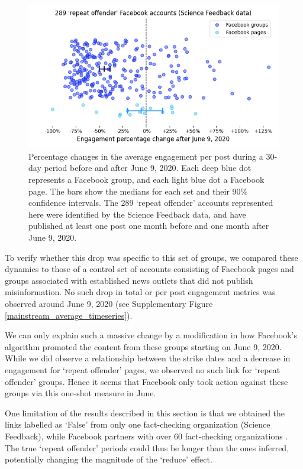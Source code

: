 \documentclass[review]{elsarticle}
\begin{document}
\begin{figure}[!h]
\centering
\includegraphics[scale=0.5]{./../figure/sf_june_drop_percentage_change.png}
\caption{
Percentage changes in the average engagement per post during a 30-day period before and after June 9, 2020. 
Each deep blue dot represents a Facebook group, and each light blue dot a Facebook page.
The bars show the medians for each set and their $90\%$ confidence intervals.
The 289 `repeat offender' accounts represented here were identified by the Science Feedback data, and have published at least one post one month before and one month after June 9, 2020.
}
\label{repeat_june_drop_percentage_change}
\end{figure}

To verify whether this drop was specific to this set of groups, we compared these dynamics to those of a control set of accounts consisting of Facebook pages and groups associated with established news outlets that did not publish misinformation.
No such drop in total or per post engagement metrics was observed around June 9, 2020 (see Supplementary Figure \ref{mainstream_average_timeseries}).

We can only explain such a massive change by a modification in how Facebook’s algorithm promoted the content from these groups starting on June 9, 2020.
While we did observe a relationship between the strike dates and a decrease in engagement for `repeat offender' pages, we observed no such link for `repeat offender' groups.
Hence it seems that Facebook only took action against these groups via this one-shot measure in June.

One limitation of the results described in this section is that we obtained the links labelled as `False' from only one fact-checking organization (Science Feedback), while Facebook partners with over 60 fact-checking organizations \citep{60factCheckingPartners}.
The true `repeat offender' periods could thus be longer than the ones inferred, potentially changing the magnitude of the ‘reduce’ effect.
\end{document}

